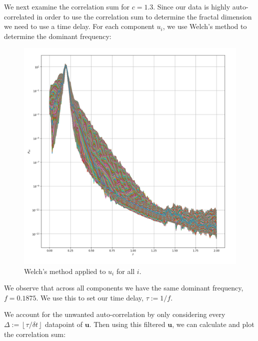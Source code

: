 \documentclass[a4paper, oneside]{book}
\begin{document}
We next examine the correlation sum for $c=1.3$.
Since our data is highly auto-correlated in order to use the correlation sum to determine
the fractal dimension we need to use a time delay. For each component $u_i$, we use Welch's
method to determine the dominant frequency:

 \begin{figure}[htpb]
    \centering
    \includegraphics[width=1.0\textwidth]{./images/welches.png}
    \caption{Welch's method applied to $u_i$ for all $i$.}
\end{figure}
We observe that across all components we have the same dominant frequency, $f = 0.1875$.
We use this to set our time delay, $\tau := 1 / f$.

We account for the unwanted auto-correlation by only considering every
$\Delta := \left\lfloor \tau / \delta t \right\rfloor$ datapoint of $\bm{u}$.
Then using this filtered $\bm{u}$, we can calculate and plot the correlation sum: 
\end{document}
